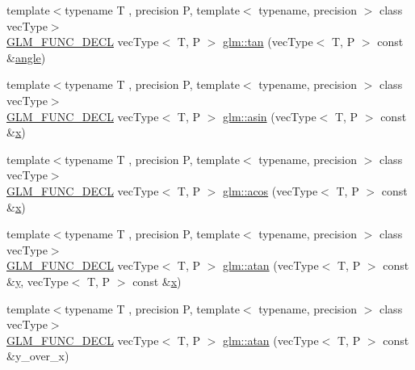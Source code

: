 \begin{DoxyCompactItemize}
\item 
{\footnotesize template$<$typename T , precision P, template$<$ typename, precision $>$ class vec\+Type$>$ }\\\mbox{\hyperlink{setup_8hpp_ab2d052de21a70539923e9bcbf6e83a51}{G\+L\+M\+\_\+\+F\+U\+N\+C\+\_\+\+D\+E\+CL}} vec\+Type$<$ T, P $>$ \mbox{\hyperlink{group__core__func__trigonometric_gab3ae890c38b7d3aa4d5e00998fd296b2}{glm\+::tan}} (vec\+Type$<$ T, P $>$ const \&\mbox{\hyperlink{group__gtc__quaternion_gad4a4448baedb198b2b1e7880d2544dc9}{angle}})
\item 
{\footnotesize template$<$typename T , precision P, template$<$ typename, precision $>$ class vec\+Type$>$ }\\\mbox{\hyperlink{setup_8hpp_ab2d052de21a70539923e9bcbf6e83a51}{G\+L\+M\+\_\+\+F\+U\+N\+C\+\_\+\+D\+E\+CL}} vec\+Type$<$ T, P $>$ \mbox{\hyperlink{group__core__func__trigonometric_ga88e29b8289e882859d76a25798dd9490}{glm\+::asin}} (vec\+Type$<$ T, P $>$ const \&\mbox{\hyperlink{glad_8h_a92d0386e5c19fb81ea88c9f99644ab1d}{x}})
\item 
{\footnotesize template$<$typename T , precision P, template$<$ typename, precision $>$ class vec\+Type$>$ }\\\mbox{\hyperlink{setup_8hpp_ab2d052de21a70539923e9bcbf6e83a51}{G\+L\+M\+\_\+\+F\+U\+N\+C\+\_\+\+D\+E\+CL}} vec\+Type$<$ T, P $>$ \mbox{\hyperlink{group__core__func__trigonometric_ga58ad259b788528fe0a4bd2eeb5e381cc}{glm\+::acos}} (vec\+Type$<$ T, P $>$ const \&\mbox{\hyperlink{glad_8h_a92d0386e5c19fb81ea88c9f99644ab1d}{x}})
\item 
{\footnotesize template$<$typename T , precision P, template$<$ typename, precision $>$ class vec\+Type$>$ }\\\mbox{\hyperlink{setup_8hpp_ab2d052de21a70539923e9bcbf6e83a51}{G\+L\+M\+\_\+\+F\+U\+N\+C\+\_\+\+D\+E\+CL}} vec\+Type$<$ T, P $>$ \mbox{\hyperlink{group__core__func__trigonometric_ga461e769acb8b8cb695a5a89334546611}{glm\+::atan}} (vec\+Type$<$ T, P $>$ const \&\mbox{\hyperlink{glad_8h_a66ddd433d2cacfe27f5906b7e86faeed}{y}}, vec\+Type$<$ T, P $>$ const \&\mbox{\hyperlink{glad_8h_a92d0386e5c19fb81ea88c9f99644ab1d}{x}})
\item 
{\footnotesize template$<$typename T , precision P, template$<$ typename, precision $>$ class vec\+Type$>$ }\\\mbox{\hyperlink{setup_8hpp_ab2d052de21a70539923e9bcbf6e83a51}{G\+L\+M\+\_\+\+F\+U\+N\+C\+\_\+\+D\+E\+CL}} vec\+Type$<$ T, P $>$ \mbox{\hyperlink{group__core__func__trigonometric_gae8f22458bba8f2321ceb1bfc4a543216}{glm\+::atan}} (vec\+Type$<$ T, P $>$ const \&y\+\_\+over\+\_\+x)

\end{DoxyCompactItemize}
